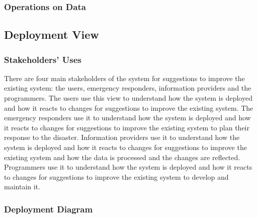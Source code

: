 \documentclass[a4paper]{article}
\begin{document}
    \subsubsection{Operations on Data}
    \begin{table}[H]
    \end{table}
    \vspace{1cm}
    \subsection{Deployment View}
    \subsubsection{Stakeholders' Uses}
    There are four main stakeholders of the system for suggestions to improve the existing system: the users, emergency responders,
    information providers and the programmers. The users use this view to understand how the system is deployed and how it reacts
    to changes for suggestions to improve the existing system. The emergency responders use it to understand how the system is
    deployed and how it reacts to changes for suggestions to improve the existing system to plan their response to the disaster.
    Information providers use it to understand how the system is deployed and how it reacts to changes for suggestions to improve
    the existing system and how the data is processed and the changes are reflected. Programmers use it to understand how the
    system is deployed and how it reacts to changes for suggestions to improve the existing system to develop and maintain it.

    \subsubsection{Deployment Diagram}
\end{document}
